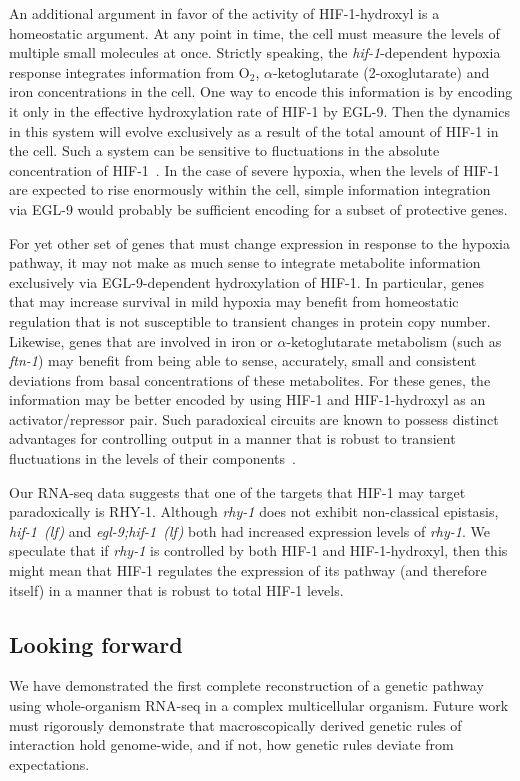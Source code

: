 \documentclass[9pt,twocolumn,twoside]{pnas-new}
\newcommand{\gene}[1]{\emph{#1}}
\newcommand{\ftna}{\emph{ftn-1}}
\newcommand{\eglhif}{\emph{egl-9;hif-1~(lf)}}
\newcommand{\hif}{\emph{hif-1~(lf)}}
\newcommand{\eglp}{EGL-9}
\newcommand{\rhyp}{RHY-1}
\newcommand{\hifp}{HIF-1}
\begin{document}
An additional argument in favor of the activity of \hifp{}-hydroxyl is a
homeostatic argument. At any point in time, the cell must measure the levels of
multiple small molecules at once. Strictly speaking, the \gene{hif-1}-dependent hypoxia
response integrates information from O$_2$, $\alpha$-ketoglutarate
(2-oxoglutarate) and iron concentrations in the cell. One way to encode this
information is by encoding it only in the effective hydroxylation rate of \hifp{} by
\eglp{}. Then the dynamics in this system will evolve exclusively as a result of
the total amount of \hifp{} in the cell. Such a system can be sensitive to
fluctuations in the absolute concentration of \hifp{}~\cite{Goentoro2009a}. In the
case of severe hypoxia, when the levels of \hifp{} are expected to rise enormously
within the cell, simple information integration via \eglp{} would probably be
sufficient encoding for a subset of protective genes.

For yet other set of genes that must change expression in response to the hypoxia
pathway, it may not make as much sense to integrate metabolite information
exclusively via \eglp{}-dependent hydroxylation of \hifp{}. In particular, genes
that may increase survival in mild hypoxia may benefit from homeostatic regulation
that is not susceptible to transient changes in protein copy number. Likewise,
genes that are involved in iron or $\alpha$-ketoglutarate metabolism
(such as \ftna{}) may benefit from being able to sense, accurately, small and
consistent deviations from basal concentrations of these metabolites. For these
genes, the information may be better encoded by using \hifp{} and
\hifp{}-hydroxyl as an activator/repressor pair. Such paradoxical circuits are
known to possess distinct advantages for controlling output in a manner that
is robust to transient fluctuations in the levels of their
components~\cite{Hart2012,Hart2013}.

Our RNA-seq data suggests that one of the targets that \hifp{} may target
paradoxically is \rhyp{}. Although \gene{rhy-1} does not exhibit non-classical epistasis,
\hif{} and \eglhif{} both had increased expression levels of \gene{rhy-1}.
We speculate that if \gene{rhy-1} is controlled by both \hifp{} and \hifp{}-hydroxyl,
then this might mean that \hifp{} regulates the expression of its pathway (and
therefore itself) in a manner that is robust to total \hifp{} levels.

\subsection{Looking forward}
We have demonstrated the first complete reconstruction of a genetic pathway using
whole-organism RNA-seq in a complex multicellular organism. Future work must
rigorously demonstrate that macroscopically derived genetic rules of interaction
hold genome-wide, and if not, how genetic rules deviate from expectations.
\end{document}
